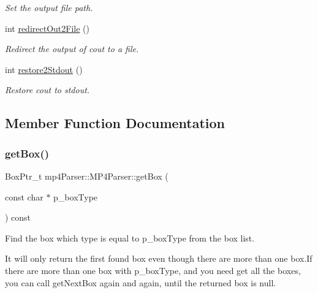 \begin{DoxyCompactItemize}
\begin{DoxyCompactList}\small\item\em Set the output file path. \end{DoxyCompactList}\item 
int \mbox{\hyperlink{classmp4_parser_1_1_m_p4_parser_a29f0fc9e2e0c7ed4751e44b8f28092c3}{redirect\+Out2\+File}} ()
\begin{DoxyCompactList}\small\item\em Redirect the output of cout to a file. \end{DoxyCompactList}\item 
int \mbox{\hyperlink{classmp4_parser_1_1_m_p4_parser_a7270d8138d1e9c6db3ed4838e5f34ee6}{restore2\+Stdout}} ()
\begin{DoxyCompactList}\small\item\em Restore cout to stdout. \end{DoxyCompactList}\end{DoxyCompactItemize}


\subsection{Member Function Documentation}
\mbox{\label{classmp4_parser_1_1_m_p4_parser_a01d96e45863265af62744aa0176ba13f}} 
\subsubsection{\texorpdfstring{getBox()}{getBox()}}
{\footnotesize\ttfamily Box\+Ptr\+\_\+t mp4\+Parser\+::\+M\+P4\+Parser\+::get\+Box (\begin{DoxyParamCaption}\item[{const char $\ast$}]{p\+\_\+box\+Type }\end{DoxyParamCaption}) const}



Find the box which type is equal to p\+\_\+box\+Type from the box list. 

It will only return the first found box even though there are more than one box.\+If there are more than one box with p\+\_\+box\+Type, and you need get all the boxes, you can call get\+Next\+Box again and again, until the returned box is null. \mbox{\label{classmp4_parser_1_1_m_p4_parser_a06442051ce3c360ab2842d5a2872989b}} 
